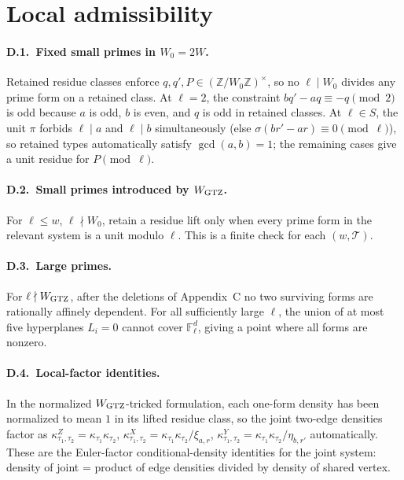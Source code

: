 \documentclass[11pt]{article}
\begin{document}
\section{Local admissibility}

\paragraph{D.1.\ Fixed small primes in \(W_0=2W\).}
Retained residue classes enforce \(q,q',P\in(\mathbb Z/W_0\mathbb Z)^\times\),
so no \(\ell\mid W_0\) divides any prime form on a retained class.  At
\(\ell=2\), the constraint \(bq'-aq\equiv-q\pmod 2\) is odd because \(a\) is
odd, \(b\) is even, and \(q\) is odd in retained classes.  At \(\ell\in S\),
the unit \(\pi\) forbids \(\ell\mid a\) and \(\ell\mid b\) simultaneously
(else \(\sigma(br'-ar)\equiv 0\pmod\ell\)), so retained types automatically
satisfy \(\gcd(a,b)=1\); the remaining cases give a unit residue for
\(P\pmod\ell\).

\paragraph{D.2.\ Small primes introduced by \(W_{\rm GTZ}\).}
For \(\ell\le w\), \(\ell\nmid W_0\), retain a residue lift only when every
prime form in the relevant system is a unit modulo \(\ell\).  This is a
finite check for each \((w,\mathcal T)\).

\paragraph{D.3.\ Large primes.}
For \(\ell\nmid W_{\rm GTZ}\), after the deletions of Appendix~C no two
surviving forms are rationally affinely dependent.  For all sufficiently large
\(\ell\), the union of at most five hyperplanes \(L_i=0\) cannot cover
\(\mathbb F_\ell^d\), giving a point where all forms are nonzero.

\paragraph{D.4.\ Local-factor identities.}
In the normalized \(W_{\rm GTZ}\)-tricked formulation, each one-form
density has been normalized to mean \(1\) in its lifted residue class, so the
joint two-edge densities factor as
\(
  \kappa^Z_{\tau_1,\tau_2}=\kappa_{\tau_1}\kappa_{\tau_2}
\),
\(
  \kappa^X_{\tau_1,\tau_2}=\kappa_{\tau_1}\kappa_{\tau_2}/\xi_{a,r}
\),
\(
  \kappa^Y_{\tau_1,\tau_2}=\kappa_{\tau_1}\kappa_{\tau_2}/\eta_{b,r'}
\)
automatically.  These are the Euler-factor conditional-density identities for
the joint system: density of joint = product of edge densities divided by
density of shared vertex.
\end{document}
